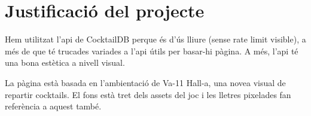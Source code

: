 \section{Justificaci\'o del projecte}
Hem utilitzat l'api de CocktailDB perque \'es d'\'us lliure (sense rate limit visible),
a m\'es de que t\'e trucades variades a l'api \'utils per basar-hi p\`agina.
A m\'es, l'api t\'e una bona est\`etica a nivell visual.

La p\`agina est\`a basada en l'ambientaci\'o de Va-11 Hall-a,
una nove\lgem a visual de repartir cocktails.
El fons est\`a tret dels assets del joc
i les lletres pixelades fan refer\`encia a aquest tamb\'e.
